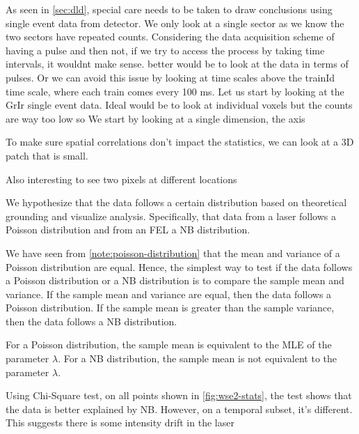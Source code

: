 As seen in \cref{sec:dld}, special care needs to be taken to draw conclusions using single event data from detector.
We only look at a single sector as we know the two sectors have repeated counts.
Considering the data acquisition scheme of having a pulse and then not, if we try to access the process by taking time intervals, it wouldnt make sense. better would be to look at the data in terms of pulses.
Or we can avoid this issue by looking at time scales above the trainId time scale, where each train comes every 100 ms.
Let us start by looking at the \gls{GrIr} single event data. Ideal would be to look at individual voxels but the counts are way too low so We start by looking at a single dimension, the  axis

To make sure spatial correlations don't impact the statistics, we can look at a 3D patch that is small.

Also interesting to see two pixels at different locations

We hypothesize that the data follows a certain distribution based on theoretical grounding and visualize analysis. Specifically, that data from a laser follows a Poisson distribution and from an \gls{FEL} a \gls{NB} distribution. 

We have seen from \cref{note:poisson-distribution} that the mean and variance of a Poisson distribution are equal. Hence, the simplest way to test if the data follows a Poisson distribution or a \gls{NB} distribution is to compare the sample mean and variance. If the sample mean and variance are equal, then the data follows a Poisson distribution. If the sample mean is greater than the sample variance, then the data follows a \gls{NB} distribution.

For a Poisson distribution, the sample mean is equivalent to the  MLE of the parameter $\lambda$. For a \gls{NB} distribution, the sample mean is not equivalent to the parameter $\lambda$.

Using Chi-Square test, on all points shown in \cref{fig:wse2-stats}, the test shows that the data is better explained by NB. However, on a temporal subset, it's different. This suggests there is some intensity drift in the laser



